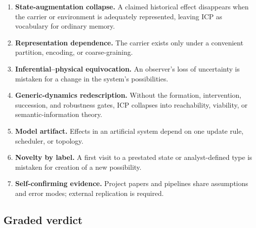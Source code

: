 \begin{enumerate}
  \item \textbf{State-augmentation collapse.} A claimed historical effect
  disappears when the carrier or environment is adequately represented,
  leaving ICP as vocabulary for ordinary memory.
  \item \textbf{Representation dependence.} The carrier exists only under a
  convenient partition, encoding, or coarse-graining.
  \item \textbf{Inferential--physical equivocation.} An observer's loss of
  uncertainty is mistaken for a change in the system's possibilities.
  \item \textbf{Generic-dynamics redescription.} Without the formation,
  intervention, succession, and robustness gates, ICP collapses into
  reachability, viability, or semantic-information theory.
  \item \textbf{Model artifact.} Effects in an artificial system depend on one
  update rule, scheduler, or topology.
  \item \textbf{Novelty by label.} A first visit to a prestated state or
  analyst-defined type is mistaken for creation of a new possibility.
  \item \textbf{Self-confirming evidence.} Project papers and pipelines share
  assumptions and error modes; external replication is required.
\end{enumerate}

\subsection{Graded verdict}

